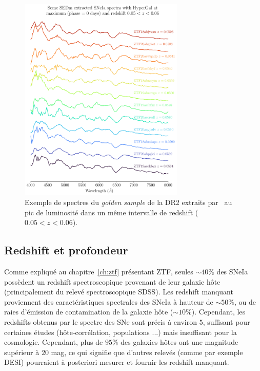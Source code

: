 \documentclass[../main/main.tex]{subfiles}
\begin{document}
\begin{figure}[ht]
  \centering
  \includegraphics[width=0.7\textwidth]{../figures/09_dr2/spec_example_hypergaldr2.pdf}
  \caption[Exemple de spectres du \textit{golden sample} de la DR2
  extraits par \hypergal.]{Exemple de spectres du \textit{golden sample} de la DR2
  extraits par \hypergal\ au pic de luminosité dans un même intervalle
  de redshift ($0.05<z<0.06$).}
  \label{fig:specexamplehypergal}
\end{figure}



\subsection{Redshift et profondeur}


Comme expliqué au chapitre~\ref{ch:ztf} présentant ZTF, seules
$\sim40\%$ des SNeIa possèdent un redshift spectroscopique provenant de
leur galaxie hôte (principalement du relevé spectroscopique SDSS). Les
redshift manquant proviennent des caractéristiques spectrales des SNeIa
à hauteur de $\sim50\%$, ou de raies d'émission de contamination de la
galaxie hôte ($\sim10\%$). Cependant, les redshifts obtenus par le
spectre des SNe sont précis à environ $5$\textperthousand, suffisant pour
certaines études (hôte-corrélation, populations ...) mais insuffisant
pour la cosmologie. Cependant, plus de $95\%$ des galaxies hôtes ont une
magnitude supérieur à $20$ mag, ce qui signifie que d'autres relevés (comme par
exemple DESI) pourraient à posteriori mesurer et fournir les redshift
manquant.
\end{document}
